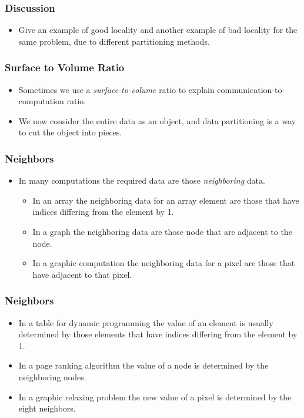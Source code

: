 \documentclass{beamer}
\begin{document}
\begin{CJK}{UTF8}{bsmi}
\begin{frame}
\frametitle{Discussion}
\begin{itemize}
\item Give an example of good locality and another example of bad
  locality for the same problem, due to different partitioning methods.
\end{itemize}
\end{frame}


\begin{frame}
\frametitle{Surface to Volume Ratio}
\begin{itemize}
\item Sometimes we use a {\em surface-to-volume} ratio to explain
  communication-to-computation ratio.
\item We now consider the entire data as an object, and data
  partitioning is a way to cut the object into pieces.
\end{itemize}
\end{frame}


\begin{frame}
\frametitle{Neighbors}
\begin{itemize}
\item In many computations the required data are those {\em
  neighboring} data.
\begin{itemize}
\item In an array the neighboring data for an array element are those
  that have indices differing from the element by 1.
\item In a graph the neighboring data are those node that are
  adjacent to the node.
\item In a graphic computation the neighboring data for a pixel are
  those that have adjacent to that pixel.
\end{itemize}
\end{itemize}
\end{frame}


\begin{frame}
\frametitle{Neighbors}
\begin{itemize}
\item In a table for dynamic programming the value of an element is
  usually determined by those elements that have indices differing
  from the element by 1.
\item In a page ranking algorithm the value of a node is determined by
  the neighboring nodes.
\item In a graphic relaxing problem the new value of a pixel is
  determined by the eight neighbors.
\end{itemize}
\end{frame}



\end{CJK}
\end{document}
